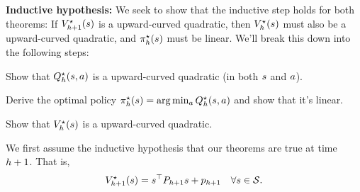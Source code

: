 \documentclass[\main/main]{subfiles}
\begin{document}
\textbf{Inductive hypothesis:} We seek to show that the inductive step holds for both theorems: If $V^\star_{h+1}(s)$ is a upward-curved quadratic, then $V^\star_h(s)$ must also be a upward-curved quadratic, and $\pi^\star_h(s)$ must be linear. We'll break this down into the following steps:
\begin{steps}
    \item Show that $Q^\star_h(s, a)$ is a upward-curved quadratic (in both $s$ and $a$).
    \item Derive the optimal policy $\pi^\star_h(s) = \arg \min_a Q^\star_h(s, a)$ and show that it's linear.
    \item Show that $V^\star_h(s)$ is a upward-curved quadratic.
\end{steps}

We first assume the inductive hypothesis that our theorems are true at time $h+1$. That is,
\[ V^\star_{h+1}(s) = s^\top P_{h+1} s + p_{h+1} \quad \forall s \in \mathcal{S}. \]
\end{document}
